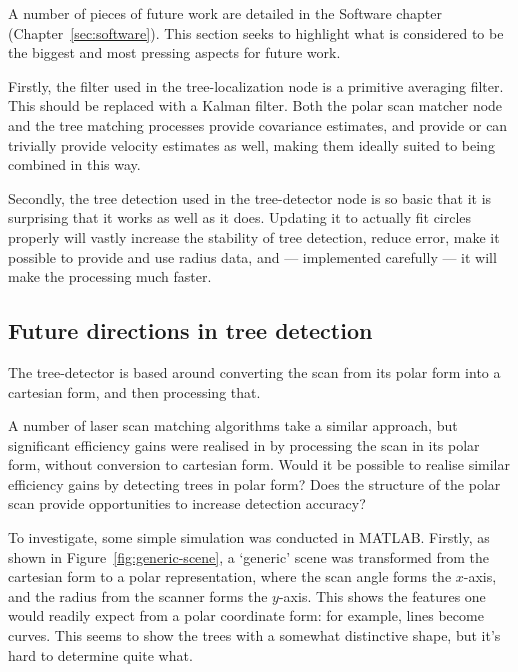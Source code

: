 \documentclass[12pt,oneside,a4paper]{book}
\begin{document}
A number of pieces of future work are detailed in the Software
chapter (Chapter~\ref{sec:software}). This section seeks to highlight
what is considered to be the biggest and most pressing aspects for
future work.

Firstly, the filter used in the tree-localization node is a primitive
averaging filter. This should be replaced with a Kalman
filter. Both the polar scan matcher node and the tree matching
processes provide covariance estimates, and provide or can trivially
provide velocity estimates as well, making them ideally suited to
being combined in this way.

Secondly, the tree detection used in the tree-detector node is so
basic that it is surprising that it works as well as it does. Updating
it to actually fit circles properly will vastly increase the stability
of tree detection, reduce error, make it possible to provide and use
radius data, and --- implemented carefully --- it will make the
processing much faster.

\subsection{Future directions in tree detection}
\label{sec:future-direct-tree}

The tree-detector is based around converting the scan from its polar
form into a cartesian form, and then processing that.

A number of laser scan matching algorithms take a similar approach,
but significant efficiency gains were realised in
\cite{polarscanmatching} by processing the scan in its polar form,
without conversion to cartesian form. Would it be possible to realise
similar efficiency gains by detecting trees in polar form? Does the
structure of the polar scan provide opportunities to increase
detection accuracy?

To investigate, some simple simulation was conducted in MATLAB. 
\newpage
Firstly, as shown in Figure~\ref{fig:generic-scene}, a `generic' scene
was transformed from the cartesian form to a polar representation,
where the scan angle forms the $x$-axis, and the radius from the
scanner forms the $y$-axis. This shows the features one would readily
expect from a polar coordinate form: for example, lines become
curves. This seems to show the trees with a somewhat distinctive
shape, but it's hard to determine quite what.
\end{document}
